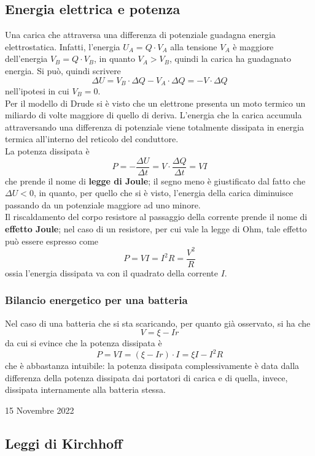 \documentclass[a4paper]{extarticle}
\begin{document}
\subsection{Energia elettrica e potenza}
Una carica che attraversa una differenza di potenziale guadagna energia elettrostatica. Infatti, l'energia $U_A=Q \cdot V_A$ alla tensione $V_A$ è maggiore dell'energia $V_B=Q \cdot V_B$, in quanto $V_A > V_B$, quindi la carica ha guadagnato energia. Si può, quindi scrivere
\[\Delta U = V_B \cdot \Delta Q - V_A \cdot \Delta Q = - V \cdot \Delta Q\]
nell'ipotesi in cui $V_B=0$.\\
Per il modello di Drude si è visto che un elettrone presenta un moto termico un miliardo di volte maggiore di quello di deriva. L'energia che la carica accumula attraversando una differenza di potenziale viene totalmente dissipata in energia termica all'interno del reticolo del conduttore.\\
La potenza dissipata è
\[\boxed{P=- \dfrac{\Delta U}{\Delta t} = V \cdot \dfrac{\Delta Q}{\Delta t} = VI}\]
che prende il nome di \textbf{legge di Joule}; il segno meno è giustificato dal fatto che $\Delta U<0$, in quanto, per quello che si è visto, l'energia della carica diminuisce passando da un potenziale maggiore ad uno minore.\\
Il riscaldamento del corpo resistore al passaggio della corrente prende il nome di \textbf{effetto Joule}; nel caso di un resistore, per cui vale la legge di Ohm, tale effetto può essere espresso come
\[\boxed{P=VI=I^2R=\dfrac{V^2}{R}}\]
ossia l'energia dissipata va con il quadrato della corrente $I$.

\vspace{1em}
\subsubsection{Bilancio energetico per una batteria}
Nel caso di una batteria che si sta scaricando, per quanto già osservato, si ha che
\[V=\xi - I r\]
da cui si evince che la potenza dissipata è
\[P=VI=(\xi - I r) \cdot I = \xi I - I^2 R\]
che è abbastanza intuibile: la potenza dissipata complessivamente è data dalla differenza della potenza dissipata dai portatori di carica e di quella, invece, dissipata internamente alla batteria stessa.

\newpage
\noindent
\begin{center}
  15 Novembre 2022
\end{center}
\subsection{Leggi di Kirchhoff}
\end{document}
